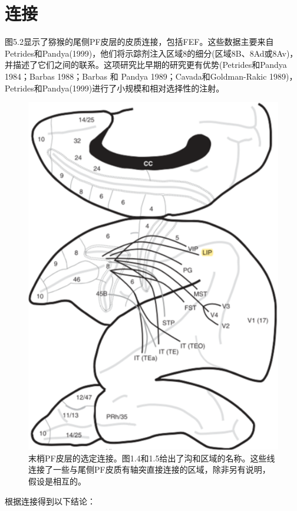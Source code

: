 \section{连接}
图5.2显示了猕猴的尾侧PF皮层的皮质连接，包括FEF。这些数据主要来自Petrides和Pandya(1999)，他们将示踪剂注入区域8的细分(区域8B、8Ad或8Av)，并描述了它们之间的联系。这项研究比早期的研究更有优势(Petrides和Pandya 1984；Barbas 1988；Barbas 和 Pandya 1989；Cavada和Goldman-Rakic 1989)， Petrides和Pandya(1999)进行了小规模和相对选择性的注射。
\begin{figure}
	\centering
	\includegraphics[width=0.7\linewidth]{image_pfc/Fig.5.2}
	\caption{末梢PF皮层的选定连接。图1.4和1.5给出了沟和区域的名称。这些线连接了一些与尾侧PF皮质有轴突直接连接的区域，除非另有说明，假设是相互的。}
	\label{fig:fig}
\end{figure}


根据连接得到以下结论：

